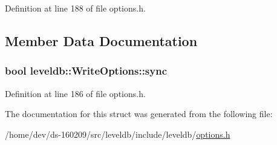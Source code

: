 Definition at line 188 of file options.\+h.



\subsection{Member Data Documentation}
\hypertarget{structleveldb_1_1_write_options_a07cd165ae5ed59a763001286e14ba47e}{}
\subsubsection[{sync}]{\setlength{\rightskip}{0pt plus 5cm}bool leveldb\+::\+Write\+Options\+::sync}\label{structleveldb_1_1_write_options_a07cd165ae5ed59a763001286e14ba47e}


Definition at line 186 of file options.\+h.



The documentation for this struct was generated from the following file\+:\begin{DoxyCompactItemize}
\item 
/home/dev/ds-\/160209/src/leveldb/include/leveldb/\hyperlink{options_8h}{options.\+h}\end{DoxyCompactItemize}
